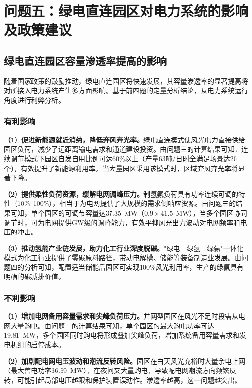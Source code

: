 \section{问题五：绿电直连园区对电力系统的影响及政策建议}

\subsection{绿电直连园区容量渗透率提高的影响}

随着国家政策的鼓励推动\cite{ref1}，绿电直连园区将快速发展，其容量渗透率的显著提高将对所接入电力系统产生多方面影响\cite{ref7}。基于前四题的定量分析结论，从电力系统运行角度进行利弊分析。

\subsubsection{有利影响}

\textbf{（1）促进新能源就近消纳，降低弃风弃光率。}绿电直连模式使风光电力直接供给园区负荷，减少了远距离输电需求和通道建设投资。由问题三的计算结果可知，连续调节模式下园区自发自用比例可达60\%以上（产量63吨/日时全满足场景达20个），有效提升了新能源利用率。当大量园区采用该模式时，区域弃风弃光率将显著下降。

\textbf{（2）提供柔性负荷资源，缓解电网调峰压力。}制氢氨负荷具有功率连续可调的特性（10\%--100\%），相当于为电网提供了大规模的需求侧响应资源\cite{ref5}。由问题三的结果可知，单个园区的可调节容量达37.35~MW（$0.9 \times 41.5$~MW），当多个园区协同调节时，可为电网提供GW级的调峰能力，有效平抑风光出力波动对电网频率和电压的冲击。

\textbf{（3）推动氢能产业链发展，助力化工行业深度脱碳。}"绿电—绿氢—绿氨"一体化模式为化工行业提供了零碳原料路径\cite{ref4}，带动电解槽、储能等装备制造业发展。由问题四的分析可知，配置适当储能后园区可实现100\%风光利用率，生产的绿氨具有明确的碳减排价值。

\subsubsection{不利影响}

\textbf{（1）增加电网备用容量需求和尖峰负荷压力。}并网型园区在风光不足时段需从电网大量购电。由问题一的计算结果可知，单个园区的最大购电功率可达19.81~MW，多个园区同时购电将形成叠加尖峰负荷，增加系统备用容量需求和发电机组的启停成本。

\textbf{（2）加剧配电网电压波动和潮流反转风险。}园区在白天风光充裕时大量余电上网（最大售电功率36.59~MW），在夜间又大量购电，导致配电网潮流方向频繁反转，可能引起局部电压越限和保护装置误动作\cite{ref10,ref11}。渗透率越高，这一问题越突出。

